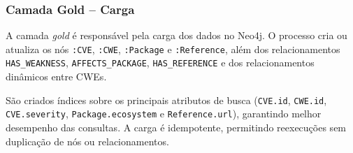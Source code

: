 \subsubsection{Camada Gold -- Carga}

A camada \textit{gold} é responsável pela carga dos dados no Neo4j. O processo cria ou atualiza os nós \texttt{:CVE}, \texttt{:CWE}, \texttt{:Package} e \texttt{:Reference}, além dos relacionamentos \texttt{HAS\_WEAKNESS}, \texttt{AFFECTS\_PACKAGE}, \texttt{HAS\_REFERENCE} e dos relacionamentos dinâmicos entre CWEs.

São criados índices sobre os principais atributos de busca (\texttt{CVE.id}, \texttt{CWE.id}, \texttt{CVE.severity}, \texttt{Package.ecosystem} e \texttt{Reference.url}), garantindo melhor desempenho das consultas. A carga é idempotente, permitindo reexecuções sem duplicação de nós ou relacionamentos.



